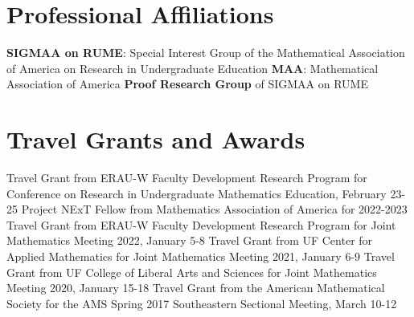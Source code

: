 \documentclass[10pt,a4paper,sans]{moderncv}
\begin{document}
\section{Professional Affiliations}
		{\textbf{SIGMAA on RUME}: Special Interest Group of the Mathematical Association of America on Research in Undergraduate Education}
		{\textbf{MAA}: Mathematical Association of America} 
		{\textbf{Proof Research Group} of SIGMAA on RUME}

\section{Travel Grants and Awards}
		{Travel Grant}
		{}
		{from ERAU-W Faculty Development Research Program for Conference on Research in Undergraduate Mathematics Education, February 23-25}
		{}{}
		{Project NExT Fellow}
		{}
		{from Mathematics Association of America for 2022-2023}
		{}{}
		{Travel Grant}
		{}
		{from ERAU-W Faculty Development Research Program for Joint Mathematics Meeting 2022, January 5-8}
		{}{}
		{Travel Grant}
		{}
		{from UF Center for Applied Mathematics for Joint Mathematics Meeting 2021, January 6-9}
		{}{}
		{Travel Grant}
		{}
		{from UF College of Liberal Arts and Sciences for Joint Mathematics Meeting 2020, January 15-18}
		{}{}
		{Travel Grant}
		{}
		{from the American Mathematical Society for the AMS Spring 2017 Southeastern Sectional Meeting, March 10-12}
		{}{}




\end{document}
